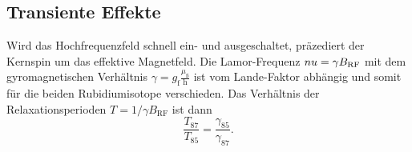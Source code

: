 \subsection{Transiente Effekte}

Wird das Hochfrequenzfeld schnell ein- und ausgeschaltet, präzediert der Kernspin um das effektive Magnetfeld. Die
Lamor-Frequenz $\\nu = \gamma B_\text{RF}$ mit dem gyromagnetischen Verhältnis $\gamma = g_\text{f}\frac{\mu_ß}{\text{h}}$
ist vom Lande-Faktor abhängig und somit für die beiden Rubidiumisotope verschieden. Das Verhältnis der Relaxationsperioden
$T = 1/\gamma B_\text{RF}$ ist dann
\begin{equation}
  \frac{T_{87}}{T_{85}} = \frac{\gamma_{85}}{\gamma_{87}}.
\end{equation}

